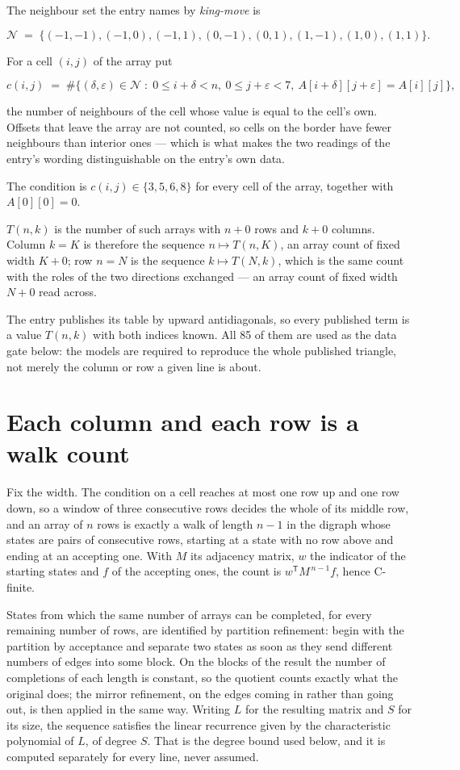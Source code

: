 \documentclass[11pt]{article}
\theoremstyle{definition}
\begin{document}
The neighbour set the entry names by {\itshape king-move} is

\[\mathcal{N} \;=\; \{(-1,-1), (-1,0), (-1,1), (0,-1), (0,1), (1,-1), (1,0), (1,1)\}.\]

For a cell $(i,j)$ of the array put

\[c(i,j) \;=\; \#\bigl\{(\delta,\varepsilon)\in\mathcal{N} \;:\; 0\le i+\delta<n,\ 0\le j+\varepsilon<7,\ A[i+\delta][j+\varepsilon] = A[i][j]\bigr\},\]

the number of neighbours of the cell whose value is equal to the cell's own. Offsets that leave the array are not counted, so cells on the border have fewer neighbours than interior ones --- which is what makes the two readings of the entry's wording distinguishable on the entry's own data.

The condition is $c(i,j) \in \{3, 5, 6, 8\}$ for every cell of the array, together with $A[0][0]=0$.

$T(n,k)$ is the number of such arrays with $n + 0$ rows and $k + 0$ columns. Column $k = K$ is therefore the sequence $n \mapsto T(n,K)$, an array count of fixed width $K + 0$; row $n = N$ is the sequence $k \mapsto T(N,k)$, which is the same count with the roles of the two directions exchanged --- an array count of fixed width $N + 0$ read across.

The entry publishes its table by upward antidiagonals, so every published term is a value $T(n,k)$ with both indices known. All 85 of them are used as the data gate below: the models are required to reproduce the whole published triangle, not merely the column or row a given line is about.

\section{Each column and each row is a walk count}

Fix the width. The condition on a cell reaches at most one row up and one row down, so a window of three consecutive rows decides the whole of its middle row, and an array of $n$ rows is exactly a walk of length $n-1$ in the digraph whose states are pairs of consecutive rows, starting at a state with no row above and ending at an accepting one. With $M$ its adjacency matrix, $w$ the indicator of the starting states and $f$ of the accepting ones, the count is $w^{\mathsf T}M^{\,n-1}f$, hence C-finite.

States from which the same number of arrays can be completed, for every remaining number of rows, are identified by partition refinement: begin with the partition by acceptance and separate two states as soon as they send different numbers of edges into some block. On the blocks of the result the number of completions of each length is constant, so the quotient counts exactly what the original does; the mirror refinement, on the edges coming in rather than going out, is then applied in the same way. Writing $L$ for the resulting matrix and $S$ for its size, the sequence satisfies the linear recurrence given by the characteristic polynomial of $L$, of degree $S$. That is the degree bound used below, and it is computed separately for every line, never assumed.
\end{document}
